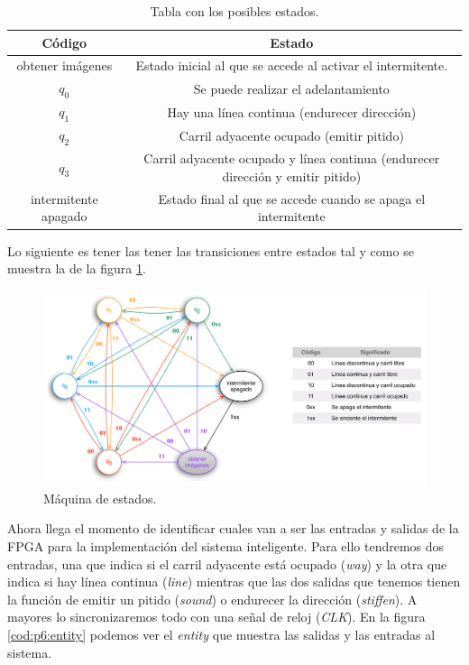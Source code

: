 \documentclass{article}
\begin{document}
\begin{table}
	\begin{center}
		\begin{tabular}{|c|c|}
\hline
\textbf{Código} & \textbf{Estado} \\ \hline
\hline
obtener imágenes & Estado inicial al que se accede al activar el intermitente.\\ \hline
$q_0$ & Se puede realizar el adelantamiento\\ \hline
$q_1$ & Hay una línea continua (endurecer dirección)\\ \hline
$q_2$ & Carril adyacente ocupado (emitir pitido)\\ \hline
$q_3$ & Carril adyacente ocupado y línea continua (endurecer dirección y emitir pitido)\\ \hline
intermitente apagado & Estado final al que se accede cuando se apaga el intermitente\\ \hline
		\end{tabular}
		\caption{Tabla con los posibles estados.}
		\label{tab:p6:estados}
	\end{center}
\end{table}

	Lo siguiente es tener las tener las transiciones entre estados tal y como se muestra la de la figura \ref{fig:p6:estados}.

\begin{figure}[h]
  \centering
    \includegraphics[width=1\textwidth]{img/maquina_estados.pdf}
  \caption{Máquina de estados.}
  \label{fig:p6:estados}
\end{figure}

	Ahora llega el momento de identificar cuales van a ser las entradas y salidas de la FPGA para la implementación del sistema inteligente. Para ello tendremos dos entradas, una que indica si el carril adyacente está ocupado (\emph{way}) y la otra que indica si hay línea continua (\emph{line}) mientras que las dos salidas que tenemos tienen la función de emitir un pitido (\emph{sound}) o endurecer la dirección (\emph{stiffen}). A mayores lo sincronizaremos todo con una señal de reloj (\emph{CLK}). En la figura \ref{cod:p6:entity} podemos ver el \emph{entity} que muestra las salidas y las entradas al sistema.
	
\end{document}
